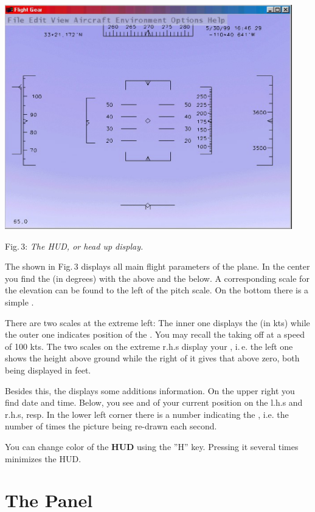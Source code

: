  \centerline{
\includegraphics[clip,width=12.5cm]{hud.eps}
}

\smallskip
 \noindent
Fig.\,3: \textit{The HUD, or head up display.}
\medskip

The  shown in Fig.\,3  displays all main flight parameters of the plane. In
the center you find the  (in degrees) with the  above and the  below. A corresponding scale for the
elevation can be found to the left of the pitch scale. On the
bottom there is a simple .

There are two scales at the extreme left: The inner one displays the  (in
kts) while the outer one indicates position of the . You may recall the
 taking off at a speed of 100 kts. The two scales on the extreme r.h.s
display your , i.\,e. the left one shows the height above ground while the
right of it gives that above zero, both being displayed in feet.

Besides this, the  displays some additions information. On the upper right you
find date and time. Below, you see  and  of your current
position on the l.h.s and r.h.s, resp. In the lower left corner there is a number
indicating the , i.e. the number of times the picture being re-drawn
each second.

You can change color of the \textbf{HUD} using the ''H'' key. Pressing it several times
minimizes the HUD.

\section{The Panel}

